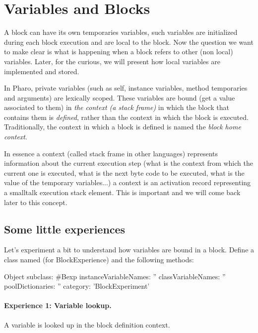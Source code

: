 \documentclass[a4paper,10pt,twoside]{book}
\begin{document}
\section{Variables and Blocks}
A block can have its own temporaries variables, such variables are initialized during each block execution and are local to the block. Now the question we want to make clear is what is happening when a block refers to other (non local) variables. Later, for the curious, we will present how local variables are implemented and stored.

In Pharo, private variables (such as self, instance variables, method temporaries and arguments) are lexically scoped. These variables are bound (get a value associated to them) in \emph{the context (a stack frame)} in which the block that contains them is \emph{defined}, rather than the context in which the block is executed.  Traditionally, the context in which a block is defined is named the \emph{block home context}.

In essence a context (called stack frame in other languages) represents information about the current execution step (what is the context from which the current one is executed, what is the next byte code to be executed, what is the value of the temporary variables...) a context is an activation record representing a smalltalk execution stack element. This is important and we will come back later to this concept.

\subsection{Some little experiences}
Let's experiment a bit to understand how variables are bound in a block. Define a class named  (for BlockExperience) and the following methods:

\begin{code}{}
Object subclass: #Bexp
	instanceVariableNames: ''
	classVariableNames: ''
	poolDictionaries: ''
	category: 'BlockExperiment'
\end{code}


\paragraph{Experience 1: Variable lookup.} A variable is looked up in the block definition context.
\end{document}
